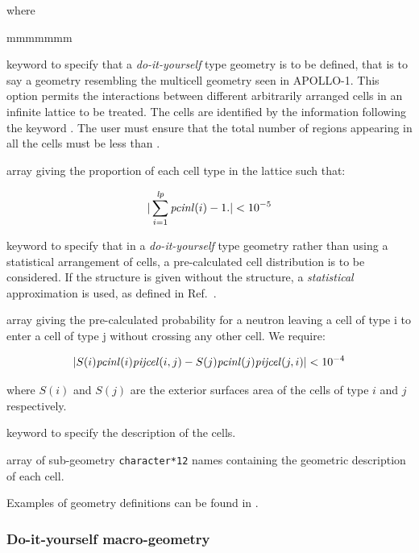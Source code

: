 \noindent where
\begin{ListeDeDescription}{mmmmmmm}

\item[\moc{POURCE}] keyword to specify that a {\sl do-it-yourself} type
geometry is to be defined, that is to say a geometry resembling the multicell
geometry seen in APOLLO-1.\cite{apollo1} This option permits the interactions
between different arbitrarily arranged cells in an infinite lattice to be
treated. The cells are identified by the information
following the keyword . The user must ensure that the total number of
regions appearing in all the cells must be less than .

\item[\dusa{pcinl}] array giving the proportion of each cell type in the
lattice such that:

$$|\sum_{i=1}^{{\it lp}}{\it pcinl}(i)-1.|<10^{-5}$$

\item[\moc{PROCEL}] keyword to specify that in a {\sl do-it-yourself} type
geometry rather than using a statistical arrangement of cells, a pre-calculated
cell distribution is to be considered. If the  structure is
given without the  structure, a {\sl statistical} approximation
is used, as defined in Ref.~.

\item[\dusa{pijcel}] array giving the pre-calculated probability for a neutron
leaving a cell of type i to enter a cell of type j without crossing any other
cell. We require: 

$$|S(i){\it pcinl}(i){\it pijcel}(i,j)-S(j){\it pcinl}(j) {\it
pijcel}(j,i)|<10^{-4}$$

\noindent where $S(i)$ and $S(j)$ are the exterior surfaces area of the cells of
type $i$ and $j$ respectively.

\item[\moc{CELL}] keyword to specify the description of the cells.

\item[\dusa{HCELL}] array of sub-geometry {\tt character*12} names containing the
geometric description of each cell. 

\end{ListeDeDescription}

Examples of geometry definitions can be found in .

\subsubsection{Do-it-yourself macro-geometry}\label{sect:descMACRO}

